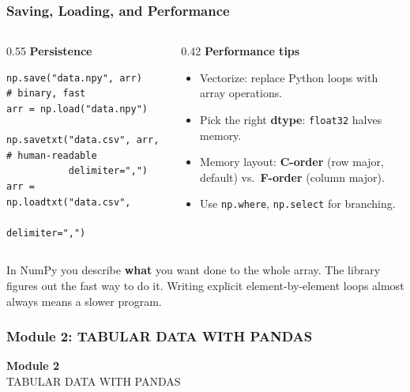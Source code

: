\documentclass[aspectratio=169,10pt]{beamer}
\newcommand{\keyword}[1]{\textcolor{PrimaryBlue}{\textbf{#1}}}
\newcommand{\codeword}[1]{\texttt{#1}}
\newenvironment{bluebox}[1]{%
  \vspace{0.08cm}\begin{tcolorbox}[lecturebox,title={#1},fontupper=\small]%
}{\end{tcolorbox}\vspace{0.05cm}}
\begin{document}
\begin{frame}[fragile]
\frametitle{Saving, Loading, and Performance}
\small
\begin{columns}[T,totalwidth=0.98\textwidth]
\begin{column}{0.55\textwidth}
\textbf{Persistence}
\begin{lstlisting}[style=pycodesmall]
np.save("data.npy", arr)         # binary, fast
arr = np.load("data.npy")

np.savetxt("data.csv", arr,      # human-readable
           delimiter=",")
arr = np.loadtxt("data.csv",
                 delimiter=",")
\end{lstlisting}
\end{column}
\begin{column}{0.42\textwidth}
\textbf{Performance tips}
\begin{itemize}\setlength\itemsep{0.04cm}
  \item Vectorize: replace Python loops with array operations.
  \item Pick the right \keyword{dtype}: \codeword{float32} halves memory.
  \item Memory layout: \keyword{C-order} (row major, default) vs.\ \keyword{F-order} (column major).
  \item Use \codeword{np.where}, \codeword{np.select} for branching.
\end{itemize}
\end{column}
\end{columns}

\vspace{0.15cm}
\begin{bluebox}{Mental shift}
In NumPy you describe \keyword{what} you want done to the whole array. The library figures out the fast way to do it. Writing explicit element-by-element loops almost always means a slower program.
\end{bluebox}
\end{frame}


\begin{noheadline}
\begin{frame}
\frametitle{Module 2: TABULAR DATA WITH PANDAS}
\vspace{1.2cm}
\begin{center}
  {\fontsize{30}{36}\selectfont\textbf{Module 2}}\\[0.35cm]
  {\fontsize{25}{30}\selectfont TABULAR DATA WITH PANDAS}\\[0.7cm]
\end{center}
\end{frame}
\end{noheadline}
\end{document}
